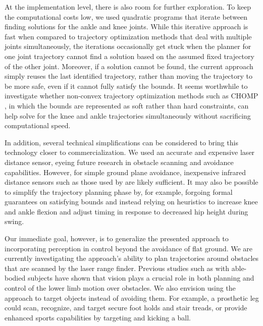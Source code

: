 At the implementation level, there is also room for further exploration. To keep
the  computational costs low, we used quadratic programs that iterate between
finding solutions for the ankle and knee joints. While this iterative approach
is fast when compared to trajectory optimization methods that deal with multiple
joints simultaneously, the iterations occasionally get stuck when the planner
for one joint trajectory cannot find a solution based on the assumed fixed
trajectory of the other joint. Moreover, if a solution cannot be found, the
current approach simply reuses the last identified trajectory, rather than
moving the trajectory to be more safe, even if it cannot fully satisfy the
bounds. It seems worthwhile to investigate whether non-convex trajectory
optimization methods such as CHOMP \citep{ratliff2009chomp}, in which the bounds
are represented as soft rather than hard constraints, can help solve for the
knee and ankle trajectories simultaneously without sacrificing computational
speed.

In addition, several technical simplifications can be considered to bring this
technology closer to commercialization. We used an accurate and expensive laser
distance sensor, eyeing future research in obstacle scanning and avoidance
capabilities. However, for simple ground plane avoidance, inexpensive infrared
distance sensors such as those used by \citet{scandaroli2009estimation} are
likely sufficient. It may also be possible to simplify the trajectory planning
phase by, for example, forgoing formal guarantees on satisfying bounds and
instead relying on heuristics to increase knee and ankle flexion and adjust
timing in response to decreased hip height during swing.

Our immediate goal, however, is to generalize the presented approach to
incorporating perception in control beyond the avoidance of flat ground. We are
currently investigating the approach's ability to plan trajectories around
obstacles that are scanned by the laser range finder. Previous studies such as
\citet{mohagheghi2004effects} with able-bodied subjects have shown that vision
plays a crucial role in both planning and control of the lower limb motion over
obstacles. We also envision using the approach to target objects instead of
avoiding them. For example, a prosthetic leg could scan, recognize, and target
secure foot holds and stair treads, or provide enhanced sports capabilities by
targeting and kicking a ball.

